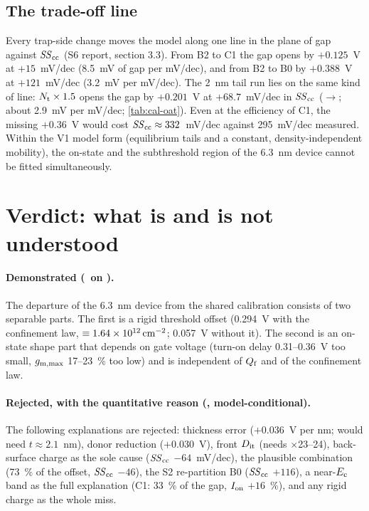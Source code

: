 \subsection{The trade-off line}
Every trap-side change moves the model along one line in the plane of gap against $\mathit{SS}_{\mathrm{cc}}$ (S6 report, section 3.3). From B2 to C1 the gap opens by $+0.125$~V at $+15$~mV/dec (8.5~mV of gap per mV/dec), and from B2 to B0 by $+0.388$~V at $+121$~mV/dec (3.2~mV per mV/dec). The 2~nm tail run lies on the same kind of line: $N_{\mathrm{t}}\times1.5$ opens the gap by $+0.201$~V at $+68.7$~mV/dec in $\mathit{SS}_{\mathrm{cc}}$ ($\rightarrow$; about 2.9~mV per mV/dec; \cref{tab:cal-oat}). Even at the efficiency of C1, the missing $+0.36$~V would cost $\mathit{SS}_{\mathrm{cc}}\approx332$~mV/dec against 295~mV/dec measured. Within the V1 model form (equilibrium tails and a constant, density-independent mobility), the on-state and the subthreshold region of the 6.3~nm device cannot be fitted simultaneously.

\section{Verdict: what is and is not understood}\label{sec:6p3-verdict}

\paragraph{Demonstrated (\evNUM\ on \evDATA).} The departure of the 6.3~nm device from the shared calibration consists of two separable parts. The first is a rigid threshold offset (0.294~V with the confinement law, $\equiv1.64\times10^{12}\,\mathrm{cm}^{-2}$; 0.057~V without it). The second is an on-state shape part that depends on gate voltage (turn-on delay 0.31--0.36~V too small, $g_{\mathrm{m,max}}$ 17--23~\% too low) and is independent of $Q_{\mathrm{f}}$ and of the confinement law.

\paragraph{Rejected, with the quantitative reason (\evNUM, model-conditional).} The following explanations are rejected: thickness error ($+0.036$~V per nm; would need $t\approx2.1$~nm), donor reduction ($+0.030$~V), front $D_{\mathrm{it}}$ (needs $\times$23--24), back-surface charge as the sole cause ($\mathit{SS}_{\mathrm{cc}}$ $-64$~mV/dec), the plausible combination (73~\% of the offset, $\mathit{SS}_{\mathrm{cc}}$ $-46$), the S2 re-partition B0 ($\mathit{SS}_{\mathrm{cc}}$ $+116$), a near-$E_{\mathrm{c}}$ band as the full explanation (C1: 33~\% of the gap, $I_{\mathrm{on}}$ $+16$~\%), and any rigid charge as the whole miss.

